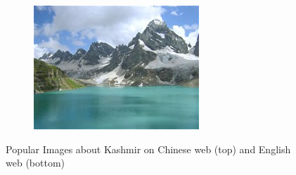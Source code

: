 \begin{figure}[th]
\begin{subfigure}{0.32\columnwidth}
        \includegraphics[width=\columnwidth]{kashmir3.jpg}
    \end{subfigure}
\caption{Popular Images about Kashmir on Chinese web (top) and
English web (bottom)}
\label{fig:kashmir}
\end{figure}


